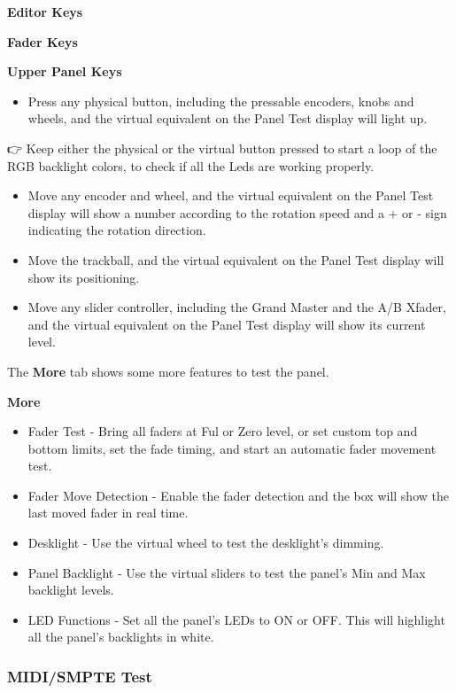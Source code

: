 \documentclass[
]{article}
\providecommand{\tightlist}{%
  \setlength{\itemsep}{0pt}\setlength{\parskip}{0pt}}
\begin{document}
\textbf{Editor Keys}

\textbf{Fader Keys}

\textbf{Upper Panel Keys}

\begin{itemize}
\tightlist
\item
  Press any physical button, including the pressable encoders, knobs and wheels, and the virtual equivalent on the Panel Test display will light up.
\end{itemize}

👉 Keep either the physical or the virtual button pressed to start a loop of the RGB backlight colors, to check if all the Leds are working properly.

\begin{itemize}
\item
  Move any encoder and wheel, and the virtual equivalent on the Panel Test display will show a number according to the rotation speed and a + or - sign indicating the rotation direction.
\item
  Move the trackball, and the virtual equivalent on the Panel Test display will show its positioning.
\item
  Move any slider controller, including the Grand Master and the A/B Xfader, and the virtual equivalent on the Panel Test display will show its current level.
\end{itemize}

The \textbf{More} tab shows some more features to test the panel.

\textbf{More}

\begin{itemize}
\item
  Fader Test - Bring all faders at Ful or Zero level, or set custom top and bottom limits, set the fade timing, and start an automatic fader movement test.
\item
  Fader Move Detection - Enable the fader detection and the box will show the last moved fader in real time.
\item
  Desklight - Use the virtual wheel to test the desklight's dimming.
\item
  Panel Backlight - Use the virtual sliders to test the panel's Min and Max backlight levels.
\item
  LED Functions - Set all the panel's LEDs to ON or OFF. This will highlight all the panel's backlights in white.
\end{itemize}

\hypertarget{midismpte-test}{%
\subsubsection{MIDI/SMPTE Test}\label{midismpte-test}}
\end{document}
